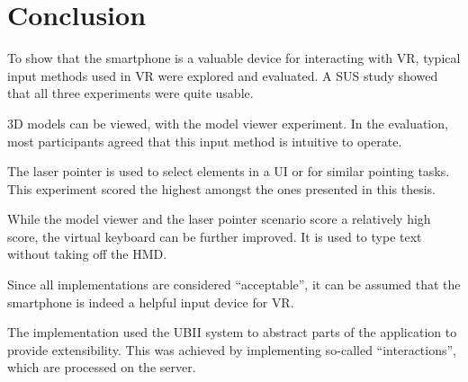 \chapter{Conclusion}\label{chapter:conclusion}

To show that the smartphone is a valuable device for interacting with \ac{VR}, typical input methods used in \ac{VR} were explored and evaluated. A \ac{SUS} study showed that all three experiments were quite usable. 

\ac{3D} models can be viewed, with the model viewer experiment. In the evaluation, most participants agreed that this input method is intuitive to operate.

The laser pointer is used to select elements in a \ac{UI} or for similar pointing tasks. This experiment scored the highest amongst the ones presented in this thesis. 

While the model viewer and the laser pointer scenario score a relatively high score, the virtual keyboard can be further improved. It is used to type text without taking off the \ac{HMD}.

Since all implementations are considered \enquote{acceptable}, it can be assumed that the smartphone is indeed a helpful input device for \ac{VR}.

The implementation used the \ac{UBII} system to abstract parts of the application to provide extensibility. This was achieved by implementing so-called \enquote{interactions}, which are processed on the server. 